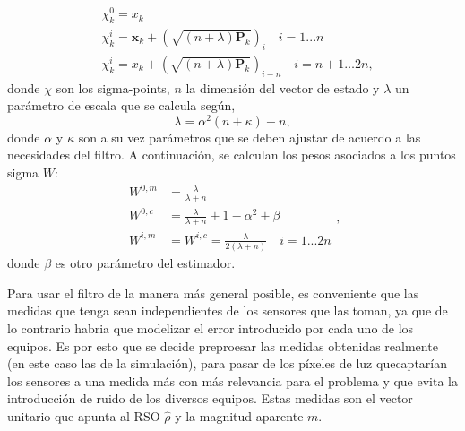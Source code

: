 \begin{equation}\begin{aligned}
    &\chi_{k}^{0} =x_{k}  \\
    &\chi_{k}^{i} =\boldsymbol{x}_k+\left(\sqrt{(n+\lambda)\mathbf{P}_k}\right)_i\quad i=1...n  \\
    &\chi_{k}^{i} =x_{k}+\left(\sqrt{(n+\lambda)\mathbf{P}_{k}}\right)_{i-n}\quad i=n+1\ldots2n, 
\end{aligned}\end{equation}
donde $\chi$ son los sigma-points, $n$ la dimensión del vector de estado y $\lambda$ un parámetro de escala que se calcula según,
\begin{equation}
\lambda = \alpha^2(n+\kappa)-n,
\end{equation}
donde $\alpha$ y $\kappa$ son a su vez parámetros que se deben ajustar de acuerdo a las necesidades del filtro. A continuación, se calculan los pesos asociados a los puntos sigma $W$:
\begin{equation}\begin{aligned}W^{0,m}&=\frac\lambda{\lambda+n}\\W^{0,c}&=\frac\lambda{\lambda+n}+1-\alpha^2+\beta\\W^{i,m}&=W^{i,c}=\frac\lambda{2(\lambda+n)}\quad i=1...2n\end{aligned},\end{equation}
donde $\beta$ es otro parámetro del estimador. 

Para usar el filtro de la manera más general posible, es conveniente que las medidas que tenga sean independientes de los sensores que las toman, ya que de lo contrario habria que modelizar el error introducido por cada uno de los equipos. Es por esto que se decide preproesar las medidas obtenidas realmente (en este caso las de la simulación), para pasar de los píxeles de luz quecaptarían los sensores a una medida más con más relevancia para el problema y que evita la introducción de ruido de los diversos equipos. Estas medidas son el vector unitario que apunta al RSO $\hat{\rho}$  y la magnitud aparente $m$.